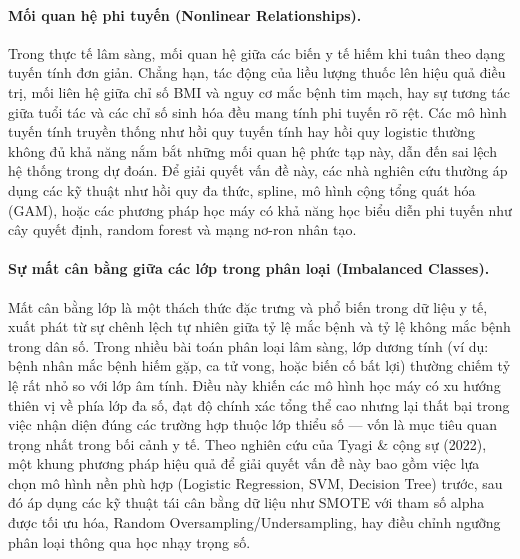 \paragraph{Mối quan hệ phi tuyến (Nonlinear Relationships).}
Trong thực tế lâm sàng, mối quan hệ giữa các biến y tế hiếm khi tuân theo dạng tuyến tính đơn giản. Chẳng hạn, tác động của liều lượng thuốc lên hiệu quả điều trị, mối liên hệ giữa chỉ số BMI và nguy cơ mắc bệnh tim mạch, hay sự tương tác giữa tuổi tác và các chỉ số sinh hóa đều mang tính phi tuyến rõ rệt. Các mô hình tuyến tính truyền thống như hồi quy tuyến tính hay hồi quy logistic thường không đủ khả năng nắm bắt những mối quan hệ phức tạp này, dẫn đến sai lệch hệ thống trong dự đoán. Để giải quyết vấn đề này, các nhà nghiên cứu thường áp dụng các kỹ thuật như hồi quy đa thức, spline, mô hình cộng tổng quát hóa (GAM), hoặc các phương pháp học máy có khả năng học biểu diễn phi tuyến như cây quyết định, random forest và mạng nơ-ron nhân tạo.
 
\paragraph{Sự mất cân bằng giữa các lớp trong phân loại (Imbalanced Classes).}
Mất cân bằng lớp là một thách thức đặc trưng và phổ biến trong dữ liệu y tế, xuất phát từ sự chênh lệch tự nhiên giữa tỷ lệ mắc bệnh và tỷ lệ không mắc bệnh trong dân số. Trong nhiều bài toán phân loại lâm sàng, lớp dương tính (ví dụ: bệnh nhân mắc bệnh hiếm gặp, ca tử vong, hoặc biến cố bất lợi) thường chiếm tỷ lệ rất nhỏ so với lớp âm tính. Điều này khiến các mô hình học máy có xu hướng thiên vị về phía lớp đa số, đạt độ chính xác tổng thể cao nhưng lại thất bại trong việc nhận diện đúng các trường hợp thuộc lớp thiểu số --- vốn là mục tiêu quan trọng nhất trong bối cảnh y tế. Theo nghiên cứu của Tyagi \& cộng sự (2022), một khung phương pháp hiệu quả để giải quyết vấn đề này bao gồm việc lựa chọn mô hình nền phù hợp (Logistic Regression, SVM, Decision Tree) trước, sau đó áp dụng các kỹ thuật tái cân bằng dữ liệu như SMOTE với tham số alpha được tối ưu hóa, Random Oversampling/Undersampling, hay điều chỉnh ngưỡng phân loại thông qua học nhạy trọng số.
 
